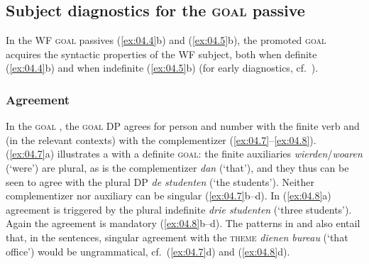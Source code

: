 \documentclass[output=paper]{langsci/langscibook}
\begin{document}
\subsection{Subject diagnostics for the \textsc{goal}
passive}\label{sec:04.2.2}

In the \gls{WF} \textsc{goal} passives (\ref{ex:04.4}b) and
(\ref{ex:04.5}b), the promoted \textsc{goal} acquires the syntactic properties
of the \gls{WF} subject, both when definite (\ref{ex:04.4}b)
and when indefinite (\ref{ex:04.5}b) (for early diagnostics, cf.\
\citealt{Haegeman1986a,Haegeman1986b}).

\subsubsection{Agreement}\label{ssub:agreement}

In the \textsc{goal} , the \textsc{goal} DP agrees for person and
number with the finite verb and (in the relevant contexts) with the
complementizer (\ref{ex:04.7}--\ref{ex:04.8}). (\ref{ex:04.7}a)
illustrates a  with a definite \textsc{goal}: the finite
auxiliaries \emph{wierden}/\emph{woaren} (‘were’) are plural, as is the
complementizer \emph{dan} (‘that’), and they thus can be seen to agree with the
plural DP \emph{de studenten} (‘the students’). Neither complementizer nor
auxiliary can be singular (\ref{ex:04.7}b--d). In (\ref{ex:04.8}a) agreement is
triggered by the plural indefinite \emph{drie studenten} (‘three students’).
Again the agreement is mandatory (\ref{ex:04.8}b--d). The patterns in  and
\REF{ex:04.8} also entail that, in the \isi{passive} sentences, singular
agreement with the \textsc{theme} \emph{dienen bureau} (‘that office’) would be
ungrammatical, cf.\ (\ref{ex:04.7}d) and (\ref{ex:04.8}d).
\end{document}
